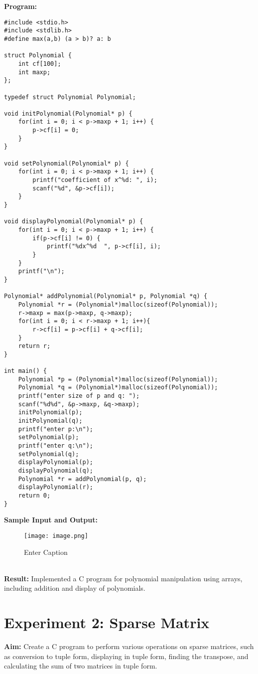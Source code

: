 \documentclass{article}
\begin{document}
\textbf{Program:}
\begin{lstlisting}
#include <stdio.h>
#include <stdlib.h>
#define max(a,b) (a > b)? a: b

struct Polynomial {
    int cf[100];
    int maxp;
};

typedef struct Polynomial Polynomial;

void initPolynomial(Polynomial* p) {
    for(int i = 0; i < p->maxp + 1; i++) {
        p->cf[i] = 0;
    }
}

void setPolynomial(Polynomial* p) {
    for(int i = 0; i < p->maxp + 1; i++) {
        printf("coefficient of x^%d: ", i);
        scanf("%d", &p->cf[i]);
    }
}

void displayPolynomial(Polynomial* p) {
    for(int i = 0; i < p->maxp + 1; i++) {
        if(p->cf[i] != 0) {
            printf("%dx^%d  ", p->cf[i], i);
        }
    }
    printf("\n");
}

Polynomial* addPolynomial(Polynomial* p, Polynomial *q) {
    Polynomial *r = (Polynomial*)malloc(sizeof(Polynomial));
    r->maxp = max(p->maxp, q->maxp);
    for(int i = 0; i < r->maxp + 1; i++){ 
        r->cf[i] = p->cf[i] + q->cf[i];
    }
    return r;
}

int main() {
    Polynomial *p = (Polynomial*)malloc(sizeof(Polynomial));
    Polynomial *q = (Polynomial*)malloc(sizeof(Polynomial));
    printf("enter size of p and q: ");
    scanf("%d%d", &p->maxp, &q->maxp);
    initPolynomial(p);
    initPolynomial(q);
    printf("enter p:\n");
    setPolynomial(p);
    printf("enter q:\n");
    setPolynomial(q);
    displayPolynomial(p);
    displayPolynomial(q);
    Polynomial *r = addPolynomial(p, q);
    displayPolynomial(r);
    return 0;
}
\end{lstlisting}
\textbf{Sample Input and Output:}
\begin{figure}[h]
    \centering
    \texttt{[image: image.png]}
    \caption{Enter Caption}
    \label{fig:enter-label}
\end{figure}
\\
\textbf{Result:} Implemented a C program for polynomial manipulation using arrays, including addition and display of polynomials.

\clearpage
\section{Experiment 2: Sparse Matrix}
\textbf{Aim:} Create a C program to perform various operations on sparse matrices, such as conversion to tuple form, displaying in tuple form, finding the transpose, and calculating the sum of two matrices in tuple form.
\end{document}
